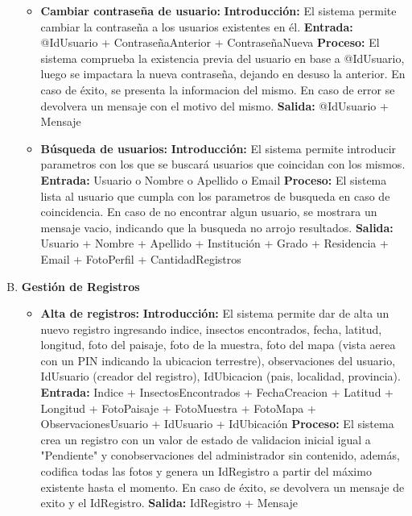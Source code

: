 \begin{enumerate}[A.]
\begin{itemize}
          \item \textbf{Cambiar contraseña de usuario:}
            \tab \textbf{Introducción:} El sistema permite cambiar la contraseña a los usuarios existentes en él.
            \tab \textbf{Entrada:} @IdUsuario + ContraseñaAnterior + ContraseñaNueva
            \tab \textbf{Proceso:} El sistema comprueba la existencia previa del usuario en base a @IdUsuario, luego se impactara la nueva contraseña, dejando en desuso la anterior. En caso de éxito, se presenta la informacion del mismo. En caso de error se devolvera un mensaje con el motivo del mismo.
            \tab \textbf{Salida:} @IdUsuario + Mensaje

          \item \textbf{Búsqueda de usuarios:}
            \tab \textbf{Introducción:} El sistema permite introducir parametros con los que se buscará usuarios que coincidan con los mismos.
            \tab \textbf{Entrada:} Usuario o Nombre o Apellido o Email
            \tab \textbf{Proceso:} El sistema lista al usuario que cumpla con los parametros de busqueda en caso de coincidencia. En caso de no encontrar algun usuario, se mostrara un mensaje vacio, indicando que la busqueda no arrojo resultados.
            \tab \textbf{Salida:} Usuario + Nombre + Apellido + Institución + Grado + Residencia + Email + FotoPerfil + CantidadRegistros

        \end{itemize}

      \item \textbf{Gestión de Registros}
        \begin{itemize}
          \item \textbf{Alta de registros:}
            \tab \textbf{Introducción:} El sistema permite dar de alta un nuevo registro ingresando indice, insectos encontrados, fecha, latitud, longitud, foto del paisaje, foto de la muestra, foto del mapa (vista aerea con un PIN indicando la ubicacion terrestre), observaciones del usuario, IdUsuario (creador del registro), IdUbicacion (pais, localidad, provincia).
            \tab \textbf{Entrada:} Indice + InsectosEncontrados + FechaCreacion + Latitud + Longitud + FotoPaisaje + FotoMuestra + FotoMapa + ObservacionesUsuario + IdUsuario + IdUbicación
            \tab \textbf{Proceso:} El sistema crea un registro con un valor de estado de validacion inicial igual a "Pendiente" y conobservaciones del administrador sin contenido, además, codifica todas las fotos y genera un IdRegistro a partir del máximo existente hasta el momento. En caso de éxito, se devolvera un mensaje de exito y el IdRegistro.
            \tab \textbf{Salida:} IdRegistro + Mensaje


\end{itemize}
\end{enumerate}
